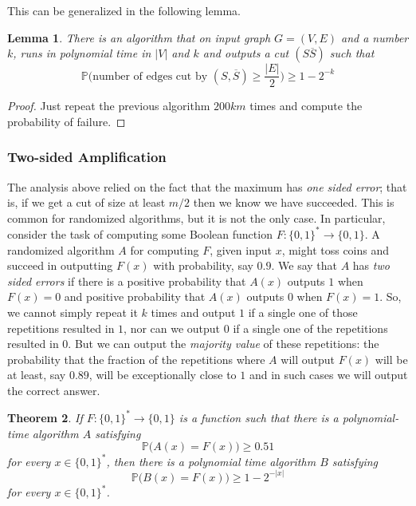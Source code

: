 \documentclass[a4paper, 12pt]{report}
\newtheorem{theorem}{Theorem}[section]
\newtheorem{lemma}[theorem]{Lemma}
\theoremstyle{remark}
\theoremstyle{definition}
\begin{document}
This can be generalized in the following lemma. 

\begin{lemma}
There is an algorithm that on input graph $G = (V, E)$ and a number $k$, runs in polynomial time in $|V|$ and $k$ and outputs a cut $(S \overline{S})$ such that
\[\mathbb{P}\Big(\text{number of edges cut by } (S, \overline{S}) \geq \frac{|E|}{2} \Big) \geq 1 - 2^{-k}\]
\end{lemma}
\begin{proof}
Just repeat the previous algorithm $200km$ times and compute the probability of failure. 
\end{proof}

\subsubsection{Two-sided Amplification}
The analysis above relied on the fact that the maximum has \textit{one sided error}; that is, if we get a cut of size at least $m/2$ then we know we have succeeded. This is common for randomized algorithms, but it is not the only case. In particular, consider the task of computing some Boolean function $F: \{0,1\}^* \longrightarrow \{0,1\}$. A randomized algorithm $A$ for computing $F$, given input $x$, might toss coins and succeed in outputting $F(x)$ with probability, say $0.9$. We say that $A$ has \textit{two sided errors} if there is a positive probability that $A(x)$ outputs $1$ when $F(x) = 0$ and positive probability that $A(x)$ outputs $0$ when $F(x) = 1$. So, we cannot simply repeat it $k$ times and output $1$ if a single one of those repetitions resulted in $1$, nor can we output $0$ if a single one of the repetitions resulted in $0$. But we can output the \textit{majority value} of these repetitions: the probability that the fraction of the repetitions where $A$ will output $F(x)$ will be at least, say $0.89$, will be exceptionally close to $1$ and in such cases we will output the correct answer. 

\begin{theorem}
If $F: \{0,1\}^* \longrightarrow \{0,1\}$ is a function such that there is a polynomial-time algorithm $A$ satisfying 
\[\mathbb{P} \big( A(x) = F(x) \big) \geq 0.51\]
for every $x \in \{0,1\}^*$, then there is a polynomial time algorithm $B$ satisfying
\[\mathbb{P} \big( B(x) = F(x) \big) \geq 1 - 2^{-|x|}\]
for every $x \in \{0,1\}^*$. 
\end{theorem}
\end{document}
